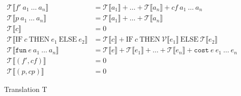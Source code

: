 \begin{figure}
  \begin{align*}
    \mathcal{T}\llbracket f'\ a_{1}\ \dots\ a_{n}\rrbracket &= \mathcal{T}\llbracket a_{1}\rrbracket + \dots + \mathcal{T}\llbracket a_{n}\rrbracket + cf\ a_{1}\ \dots\ a_{n}\\
    \mathcal{T}\llbracket p\ a_{1}\ \dots\ a_{n}\rrbracket &= \mathcal{T}\llbracket a_{1}\rrbracket + \dots + \mathcal{T}\llbracket a_{n}\rrbracket\\
    \mathcal{T}\llbracket c \rrbracket &= 0\\
    \mathcal{T}\llbracket \text{IF}\ c\ \text{THEN}\ e_{1}\ \text{ELSE}\ e_{2}\rrbracket &= \mathcal{T}\llbracket c\rrbracket + \text{IF}\  c\ \text{THEN}\ \mathcal{V}\llbracket e_{1}\rrbracket\ \text{ELSE}\ \mathcal{T}\llbracket e_{2}\rrbracket\\
    \mathcal{T}\llbracket\texttt{fun}\ e\ a_{1}\ \dots\ a_{n}\rrbracket &= \mathcal{T}\llbracket e\rrbracket + \mathcal{T}\llbracket e_{1}\rrbracket + \dots + \mathcal{T}\llbracket e_{n}\rrbracket + \texttt{cost}\ e\ e_{1}\ \dots\ e_{n}\\
    \mathcal{T}\llbracket (f',cf)\rrbracket &= 0\\
    \mathcal{T}\llbracket (p,cp)\rrbracket &= 0
  \end{align*}
  \caption{Translation T}
  \label{fig:higher_T}
\end{figure}
